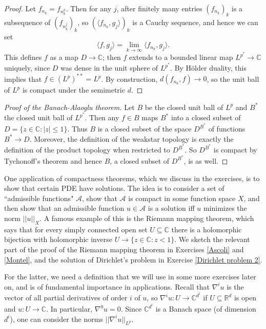 \documentclass[12pt]{book}
\newcommand{\RR}{\mathbb{R}}
\newcommand{\CC}{\mathbb{C}}
\theoremstyle{definition}
\begin{document}
\begin{proof}
Let $f_{n_k} = f_{n_k^k}$. Then for any $j$, after finitely many entries $(f_{n_k})_k$ is a subsequence of $(f_{n_k^j})_k$, so $(\langle f_{n_k}, g_j\rangle)_k$ is a Cauchy sequence, and hence we can set
$$\langle f, g_j\rangle = \lim_{k \to \infty} \langle f_{n_k}, g_j\rangle.$$
This defines $f$ as a map $D \to \CC$; then $f$ extends to a bounded linear map $L^{p^*} \to \CC$ uniquely, since $D$ was dense in the unit sphere of $L^{p^*}$.
By H\"older duality, this implies that $f \in (L^p)^{**} = L^p$.
By construction, $d(f_{n_k}, f) \to 0$, so the unit ball of $L^p$ is compact under the semimetric $d$.
\end{proof}

\begin{proof}[Proof of the Banach-Alaoglu theorem]
Let $B$ be the closed unit ball of $L^p$ and $B^*$ the closed unit ball of $L^{p^*}$.
Then any $f \in B$ maps $B^*$ into a closed subset of $D = \{z \in \CC: |z| \leq 1\}$.
Thus $B$ is a closed subset of the space $D^{B^*}$ of functions $B^* \to D$.
Moreover, the definition of the weakstar topology is exactly the definition of the product topology when restricted to $D^{B^*}$.
So $D^{B^*}$ is compact by Tychonoff's theorem and hence $B$, a closed subset of $D^{B^*}$, is as well.
\end{proof}

One application of compactness theorems, which we discuss in the exercises, is to show that certain PDE have solutions.
The idea is to consider a set of ``admissible functions" $\mathcal A$, show that $\mathcal A$ is compact in some function space $X$, and then show that an admissible function $u \in \mathcal A$ is a solution iff $u$ minimizes the norm $||u||_X$.
A famous example of this is the Riemann mapping theorem, which says that for every simply connected open set $U \subseteq \CC$ there is a holomorphic bijection with holomorphic inverse $U \to \{z \in \CC: z < 1\}$.
We sketch the relevant part of the proof of the Riemann mapping theorem in Exercises \ref{Ascoli} and \ref{Montel}, and the solution of Dirichlet's problem in Exercise \ref{Dirichlet problem 2}.

For the latter, we need a definition that we will use in some more exercises later on, and is of fundamental importance in applications.
Recall that $\nabla^iu$ is the vector of all partial derivatives of order $i$ of $u$, so $\nabla^iu: U \to \CC^{d^i}$ if $U \subseteq \RR^d$ is open and $u: U \to \CC$.
In particular, $\nabla^0u = 0$.
Since $\CC^{d^i}$ is a Banach space (of dimension $d^i$), one can consider the norms $||\nabla^iu||_{L^p}$.
\end{document}
